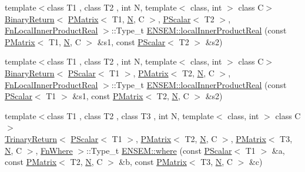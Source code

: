 \begin{DoxyCompactItemize}
\item 
{\footnotesize template$<$class T1 , class T2 , int N, template$<$ class, int $>$ class C$>$ }\\\mbox{\hyperlink{structENSEM_1_1BinaryReturn}{Binary\+Return}}$<$ \mbox{\hyperlink{classENSEM_1_1PMatrix}{P\+Matrix}}$<$ T1, \mbox{\hyperlink{operator__name__util_8cc_a7722c8ecbb62d99aee7ce68b1752f337}{N}}, C $>$, \mbox{\hyperlink{classENSEM_1_1PScalar}{P\+Scalar}}$<$ T2 $>$, \mbox{\hyperlink{structENSEM_1_1FnLocalInnerProductReal}{Fn\+Local\+Inner\+Product\+Real}} $>$\+::Type\+\_\+t \mbox{\hyperlink{group__primmatrix_ga9db3f5557c105ded2a1e426229646f23}{E\+N\+S\+E\+M\+::local\+Inner\+Product\+Real}} (const \mbox{\hyperlink{classENSEM_1_1PMatrix}{P\+Matrix}}$<$ T1, \mbox{\hyperlink{operator__name__util_8cc_a7722c8ecbb62d99aee7ce68b1752f337}{N}}, C $>$ \&s1, const \mbox{\hyperlink{classENSEM_1_1PScalar}{P\+Scalar}}$<$ T2 $>$ \&s2)
\item 
{\footnotesize template$<$class T1 , class T2 , int N, template$<$ class, int $>$ class C$>$ }\\\mbox{\hyperlink{structENSEM_1_1BinaryReturn}{Binary\+Return}}$<$ \mbox{\hyperlink{classENSEM_1_1PScalar}{P\+Scalar}}$<$ T1 $>$, \mbox{\hyperlink{classENSEM_1_1PMatrix}{P\+Matrix}}$<$ T2, \mbox{\hyperlink{operator__name__util_8cc_a7722c8ecbb62d99aee7ce68b1752f337}{N}}, C $>$, \mbox{\hyperlink{structENSEM_1_1FnLocalInnerProductReal}{Fn\+Local\+Inner\+Product\+Real}} $>$\+::Type\+\_\+t \mbox{\hyperlink{group__primmatrix_ga8a2b85a888121b8b0ff46870c7705474}{E\+N\+S\+E\+M\+::local\+Inner\+Product\+Real}} (const \mbox{\hyperlink{classENSEM_1_1PScalar}{P\+Scalar}}$<$ T1 $>$ \&s1, const \mbox{\hyperlink{classENSEM_1_1PMatrix}{P\+Matrix}}$<$ T2, \mbox{\hyperlink{operator__name__util_8cc_a7722c8ecbb62d99aee7ce68b1752f337}{N}}, C $>$ \&s2)
\item 
{\footnotesize template$<$class T1 , class T2 , class T3 , int N, template$<$ class, int $>$ class C$>$ }\\\mbox{\hyperlink{structENSEM_1_1TrinaryReturn}{Trinary\+Return}}$<$ \mbox{\hyperlink{classENSEM_1_1PScalar}{P\+Scalar}}$<$ T1 $>$, \mbox{\hyperlink{classENSEM_1_1PMatrix}{P\+Matrix}}$<$ T2, \mbox{\hyperlink{operator__name__util_8cc_a7722c8ecbb62d99aee7ce68b1752f337}{N}}, C $>$, \mbox{\hyperlink{classENSEM_1_1PMatrix}{P\+Matrix}}$<$ T3, \mbox{\hyperlink{operator__name__util_8cc_a7722c8ecbb62d99aee7ce68b1752f337}{N}}, C $>$, \mbox{\hyperlink{structENSEM_1_1FnWhere}{Fn\+Where}} $>$\+::Type\+\_\+t \mbox{\hyperlink{group__primmatrix_gacb8fae3141957f56989969c3cb8f694e}{E\+N\+S\+E\+M\+::where}} (const \mbox{\hyperlink{classENSEM_1_1PScalar}{P\+Scalar}}$<$ T1 $>$ \&a, const \mbox{\hyperlink{classENSEM_1_1PMatrix}{P\+Matrix}}$<$ T2, \mbox{\hyperlink{operator__name__util_8cc_a7722c8ecbb62d99aee7ce68b1752f337}{N}}, C $>$ \&b, const \mbox{\hyperlink{classENSEM_1_1PMatrix}{P\+Matrix}}$<$ T3, \mbox{\hyperlink{operator__name__util_8cc_a7722c8ecbb62d99aee7ce68b1752f337}{N}}, C $>$ \&c)
\end{DoxyCompactItemize}


